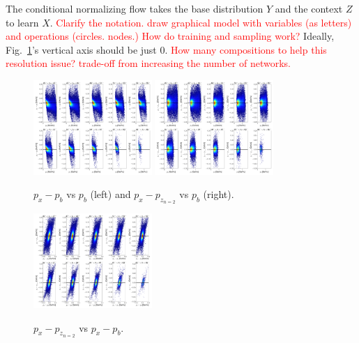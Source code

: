 The conditional normalizing flow takes the base distribution $Y$ and the context $Z$ to learn $X$. \textcolor{red}{Clarify the notation. draw graphical model with variables (as letters) and operations (circles. nodes.) How do training and sampling work?} Ideally, Fig.~\ref{fig: jul8_NF}'s vertical axis should be just 0. \textcolor{red}{How many compositions to help this resolution issue? trade-off from increasing the number of networks.} 
\begin{figure}[htb]
\centering
\includegraphics[width = 0.4\textwidth]{Chapters/Ch3-Simulations/normalizing_flows/pics/MeetingFigures/Sangbaek/raw.pdf}
\includegraphics[width = 0.4\textwidth]{Chapters/Ch3-Simulations/normalizing_flows/pics/MeetingFigures/Sangbaek/NF.pdf}
\caption{$p_x - p_{b}$ vs $p_{b}$ (left) and $p_x - p_{z_{n=2}}$ vs $p_{b}$ (right).}
\label{fig: jul8_NF}
\end{figure}

\begin{figure}[htb]
\centering
\includegraphics[width = 0.4\textwidth]{Chapters/Ch3-Simulations/normalizing_flows/pics/MeetingFigures/Sangbaek/direct.pdf}
\label{fig: jul8_direct}
\caption{$p_x - p_{z_{n=2}}$ vs $p_x - p_{b}$.}
\end{figure}

